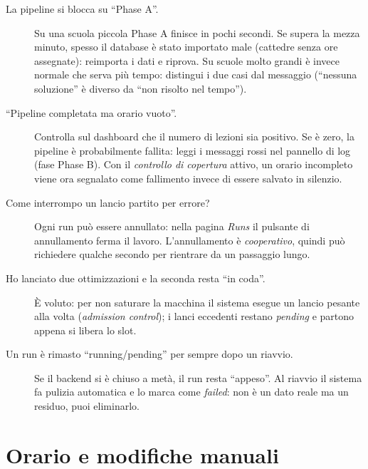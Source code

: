 \begin{description}

\item[La pipeline si blocca su ``Phase A''.]
Su una scuola piccola Phase A finisce in pochi secondi. Se supera
la mezza minuto, spesso il database \`e stato importato male
(cattedre senza ore assegnate): reimporta i dati e riprova. Su
scuole molto grandi \`e invece normale che serva pi\`u tempo:
distingui i due casi dal messaggio (``nessuna soluzione'' \`e
diverso da ``non risolto nel tempo'').

\item[``Pipeline completata ma orario vuoto''.]
Controlla sul dashboard che il numero di lezioni sia positivo. Se
\`e zero, la pipeline \`e probabilmente fallita: leggi i messaggi
rossi nel pannello di log (fase Phase B). Con il \emph{controllo
di copertura} attivo, un orario incompleto viene ora segnalato
come fallimento invece di essere salvato in silenzio.

\item[Come interrompo un lancio partito per errore?]
Ogni run pu\`o essere annullato: nella pagina \emph{Runs} il
pulsante di annullamento ferma il lavoro. L'annullamento \`e
\emph{cooperativo}, quindi pu\`o richiedere qualche secondo per
rientrare da un passaggio lungo.

\item[Ho lanciato due ottimizzazioni e la seconda resta ``in coda''.]
\`E voluto: per non saturare la macchina il sistema esegue un
lancio pesante alla volta (\emph{admission control}); i lanci
eccedenti restano \emph{pending} e partono appena si libera lo
slot.

\item[Un run \`e rimasto ``running/pending'' per sempre dopo un riavvio.]
Se il backend si \`e chiuso a met\`a, il run resta ``appeso''. Al
riavvio il sistema fa pulizia automatica e lo marca come
\emph{failed}: non \`e un dato reale ma un residuo, puoi
eliminarlo.

\end{description}

\section{Orario e modifiche manuali}


